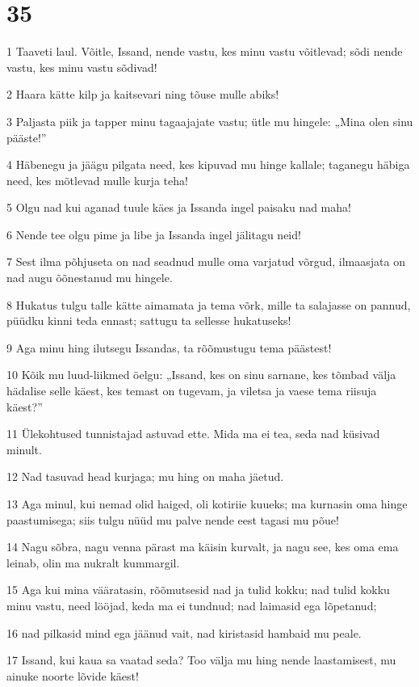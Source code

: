 \chapter{35}

\par 1 Taaveti laul. Võitle, Issand, nende vastu, kes minu vastu võitlevad; sõdi nende vastu, kes minu vastu sõdivad!
\par 2 Haara kätte kilp ja kaitsevari ning tõuse mulle abiks!
\par 3 Paljasta piik ja tapper minu tagaajajate vastu; ütle mu hingele: „Mina olen sinu pääste!”
\par 4 Häbenegu ja jäägu pilgata need, kes kipuvad mu hinge kallale; taganegu häbiga need, kes mõtlevad mulle kurja teha!
\par 5 Olgu nad kui aganad tuule käes ja Issanda ingel paisaku nad maha!
\par 6 Nende tee olgu pime ja libe ja Issanda ingel jälitagu neid!
\par 7 Sest ilma põhjuseta on nad seadnud mulle oma varjatud võrgud, ilmaasjata on nad augu õõnestanud mu hingele.
\par 8 Hukatus tulgu talle kätte aimamata ja tema võrk, mille ta salajasse on pannud, püüdku kinni teda ennast; sattugu ta sellesse hukatuseks!
\par 9 Aga minu hing ilutsegu Issandas, ta rõõmustugu tema päästest!
\par 10 Kõik mu luud-liikmed öelgu: „Issand, kes on sinu sarnane, kes tõmbad välja hädalise selle käest, kes temast on tugevam, ja viletsa ja vaese tema riisuja käest?”
\par 11 Ülekohtused tunnistajad astuvad ette. Mida ma ei tea, seda nad küsivad minult.
\par 12 Nad tasuvad head kurjaga; mu hing on maha jäetud.
\par 13 Aga minul, kui nemad olid haiged, oli kotiriie kuueks; ma kurnasin oma hinge paastumisega; siis tulgu nüüd mu palve nende eest tagasi mu põue!
\par 14 Nagu sõbra, nagu venna pärast ma käisin kurvalt, ja nagu see, kes oma ema leinab, olin ma nukralt kummargil.
\par 15 Aga kui mina vääratasin, rõõmutsesid nad ja tulid kokku; nad tulid kokku minu vastu, need lööjad, keda ma ei tundnud; nad laimasid ega lõpetanud;
\par 16 nad pilkasid mind ega jäänud vait, nad kiristasid hambaid mu peale.
\par 17 Issand, kui kaua sa vaatad seda? Too välja mu hing nende laastamisest, mu ainuke noorte lõvide käest!
